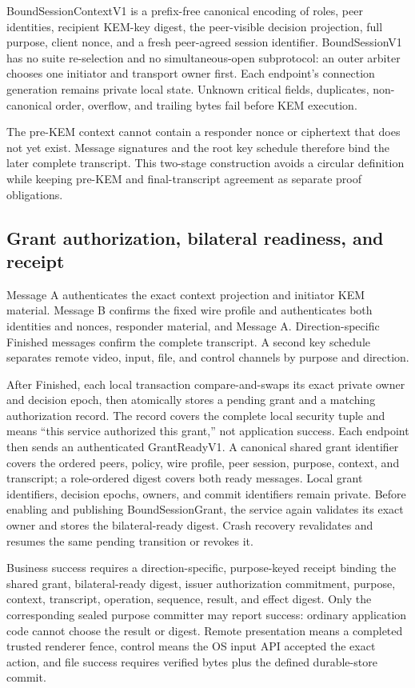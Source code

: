 \documentclass[journal]{IEEEtran}
\newcommand{\contextv}{\textsf{BoundSessionContextV1}}
\newcommand{\grant}{\textsf{BoundSessionGrant}}
\begin{document}
\contextv{} is a prefix-free canonical encoding of roles, peer identities,
recipient KEM-key digest, the peer-visible decision projection, full purpose,
client nonce, and a fresh peer-agreed session identifier. BoundSessionV1 has no
suite re-selection and no simultaneous-open subprotocol: an outer arbiter chooses
one initiator and transport owner first. Each endpoint's connection generation
remains private local state. Unknown critical fields, duplicates, non-canonical
order, overflow, and trailing bytes fail before KEM execution.

The pre-KEM context cannot contain a responder nonce or ciphertext that does not
yet exist. Message signatures and the root key schedule therefore bind the later
complete transcript. This two-stage construction avoids a circular definition
while keeping pre-KEM and final-transcript agreement as separate proof
obligations.

\subsection{Grant authorization, bilateral readiness, and receipt}
Message A authenticates the exact context projection and initiator KEM material.
Message B confirms the fixed wire profile and authenticates both identities and nonces, responder
material, and Message A. Direction-specific Finished messages confirm the
complete transcript. A second key schedule separates remote video, input,
file, and control channels by purpose and direction.

After Finished, each local transaction compare-and-swaps its exact private owner
and decision epoch, then atomically stores a pending grant and a
matching authorization record. The record covers the complete local security
tuple and means ``this service authorized this grant,'' not application success.
Each endpoint then sends an authenticated \textsf{GrantReadyV1}. A canonical
shared grant identifier covers the ordered peers, policy, wire profile, peer
session, purpose, context, and transcript; a role-ordered digest covers both
ready messages. Local grant identifiers, decision epochs, owners, and commit
identifiers remain private. Before enabling and publishing \grant{}, the service
again validates its exact owner and stores the bilateral-ready digest. Crash
recovery revalidates and resumes the same pending transition or revokes it.

Business success requires a direction-specific, purpose-keyed receipt binding
the shared grant, bilateral-ready digest, issuer authorization commitment,
purpose, context, transcript, operation, sequence, result, and effect digest.
Only the corresponding sealed purpose committer may report success: ordinary application code
cannot choose the result or digest. Remote presentation means a completed trusted
renderer fence, control means the OS input API accepted the exact action, and
file success requires verified bytes plus the defined durable-store commit.
\end{document}
